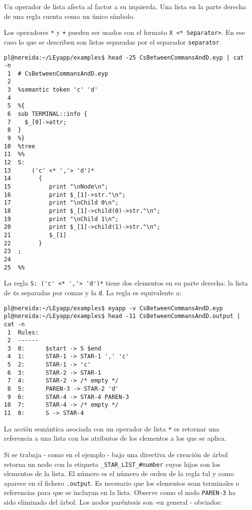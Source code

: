 
Un operador de lista afecta al factor a su izquierda.
Una lista en la parte derecha de una regla cuenta como un único
símbolo.

Los operadores \verb|*| y \verb|+| pueden ser
usados con  el formato \verb|X <* Separator>|.
En ese caso lo que se describen son listas separadas por el separador
\verb|separator|.

\begin{verbatim}
pl@nereida:~/LEyapp/examples$ head -25 CsBetweenCommansAndD.eyp | cat -n
 1  # CsBetweenCommansAndD.eyp
 2
 3  %semantic token 'c' 'd'
 4
 5  %{
 6  sub TERMINAL::info {
 7    $_[0]->attr;
 8  }
 9  %}
10  %tree
11  %%
12  S:
13      ('c' <* ','> 'd')*
14        {
15           print "\nNode\n";
16           print $_[1]->str."\n";
17           print "\nChild 0\n";
18           print $_[1]->child(0)->str."\n";
19           print "\nChild 1\n";
20           print $_[1]->child(1)->str."\n";
21           $_[1]
22        }
23  ;
24
25  %%
\end{verbatim}
La regla \verb|S: ('c' <* ','> 'd')*| tiene dos elementos en su parte derecha: la lista de \verb|c|s 
separadas por comas y la \verb|d|. La regla es equivalente a:

\begin{verbatim}
pl@nereida:~/LEyapp/examples$ eyapp -v CsBetweenCommansAndD.eyp
pl@nereida:~/LEyapp/examples$ head -11 CsBetweenCommansAndD.output | cat -n
 1  Rules:
 2  ------
 3  0:      $start -> S $end
 4  1:      STAR-1 -> STAR-1 ',' 'c'
 5  2:      STAR-1 -> 'c'
 6  3:      STAR-2 -> STAR-1
 7  4:      STAR-2 -> /* empty */
 8  5:      PAREN-3 -> STAR-2 'd'
 9  6:      STAR-4 -> STAR-4 PAREN-3
10  7:      STAR-4 -> /* empty */
11  8:      S -> STAR-4
\end{verbatim}

La acción semántica asociada con un operador de lista \verb|*| es retornar 
una referencia a una lista con los atributos de los elementos a 
los que se aplica. 

Si se trabaja - como en el ejemplo - 
bajo una directiva de creación de árbol retorna un nodo
con la etiqueta \verb|_STAR_LIST_#number| cuyos hijos son los elementos
de la lista. El número es el número de orden de la regla tal y como 
aparece en el fichero \verb|.output|. Es necesario que los elementos sean 
terminales o referencias para que se incluyan en la lista. Observe como el nodo \verb|PAREN-3|
ha sido eliminado del árbol. Los nodos paréntesis son -en general - obviados:

